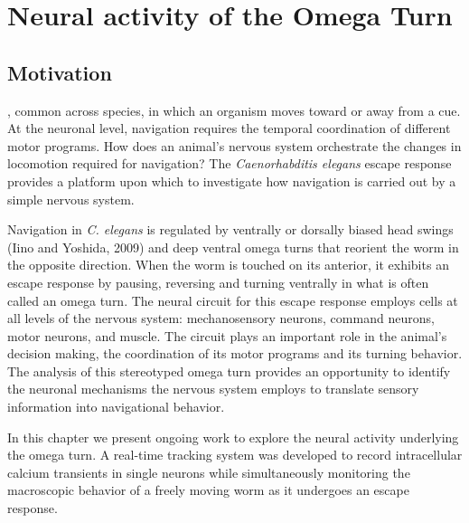 \chapter{Neural activity of the Omega Turn}\label{chapter:omegaTurn}

\section{Motivation}

, common across species, in which an organism moves toward or away from a cue.  At the neuronal level, navigation requires the temporal coordination of different motor programs.  How does an animal's nervous system orchestrate the changes in locomotion required for navigation? The \textit{Caenorhabditis elegans} escape response provides a platform upon which to investigate how navigation is carried out by a simple nervous system.  

Navigation in  \textit{C. elegans} is regulated by ventrally or dorsally biased head swings (Iino and Yoshida, 2009) and deep ventral omega turns that reorient the worm in the opposite direction.  When the worm is touched on its anterior, it exhibits an escape response by pausing, reversing and turning ventrally in what is often called an omega turn.  The neural circuit for this escape response employs cells at all levels of the nervous system: mechanosensory neurons, command neurons, motor neurons, and muscle. The circuit plays an important role in the animal's decision making, the coordination of its motor programs and its turning behavior. 
The analysis of this stereotyped omega turn provides an opportunity to identify the  neuronal mechanisms  the nervous system employs to translate sensory information into navigational behavior.  


In this chapter we present ongoing work to explore the neural activity underlying the omega turn. A real-time tracking system was developed to record intracellular calcium transients in single neurons while simultaneously monitoring the macroscopic behavior of a freely moving worm as it undergoes an escape response.

